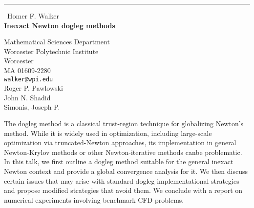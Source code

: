 \documentclass{report}
\begin{document}
\begin{center}
\rule{6in}{1pt} \
{\large Homer F. Walker \\
{\bf Inexact Newton dogleg methods}}

Mathematical Sciences Department \\ Worcester Polytechnic Institute \\ Worcester \\ MA 01609-2280
\\
{\tt walker@wpi.edu}\\
Roger P.  Pawlowski\\
John N.  Shadid\\
	Simonis, Joseph P. \end{center}

The dogleg method is a classical trust-region technique for globalizing Newton's method.
While it is widely used in optimization,
including large-scale optimization via truncated-Newton approaches,
its implementation in general Newton-Krylov methods or other Newton-iterative methods canbe problematic.
In this talk,
we first outline a dogleg method suitable for the general inexact Newton context and provide a global convergence analysis for it.
We then discuss certain issues that may arise with standard dogleg implementational strategies and propose modified strategies that avoid them.
We conclude with a report on numerical experiments involving benchmark CFD problems.
\end{document}
